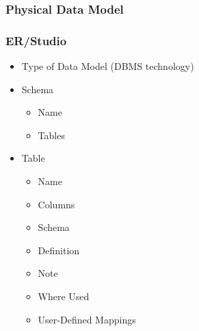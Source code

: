 \documentclass[12pt,a4paper]{report}
\begin{document}
\subsubsection{Physical Data Model}

\subsubsection{ER/Studio}

\begin{itemize}
	\item Type of Data Model (DBMS technology)
	\item Schema
	\begin{itemize}
		\item Name
		\item Tables
	\end{itemize}
	\item Table
	\begin{itemize}
		\item Name
		\item Columns
		\item Schema
		\item Definition
		\item Note
		\item Where Used
		\item User-Defined Mappings

\end{itemize}
\end{itemize}
\end{document}
